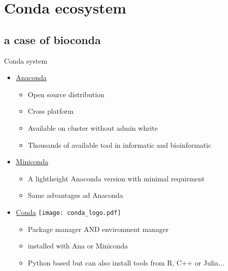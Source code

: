 \section{Conda ecosystem}
\subsection{a case of bioconda}

\begin{frame}{Conda system}
\begin{itemize}
\item<1-3> \hyperlink{https://www.anaconda.com/}{Anaconda}
	\begin{itemize}
	\item Open source distribution
    \item Cross platform
    \item Available on cluster without admin whrite
    \item Thousands of available tool in informatic and bioinformatic
	\end{itemize}
\item<2-3> \hyperlink{https://docs.conda.io/en/latest/miniconda.html}{Miniconda}
	\begin{itemize}
	\item A lightheight Anaconda version with minimal requirment
	\item Same advantages ad Anaconda
	\end{itemize}
\item<3> \hyperlink{https://docs.conda.io/projects/conda/en/latest/index.html}{Conda} \texttt{[image: conda\_logo.pdf]} 
	\begin{itemize}[<4->]
	\item Package manager AND environment manager
	\item installed with Ana or Miniconda
	\item Python based but can also install tools from R, C++ or Julia...
	\end{itemize}
\end{itemize}
\end{frame}

